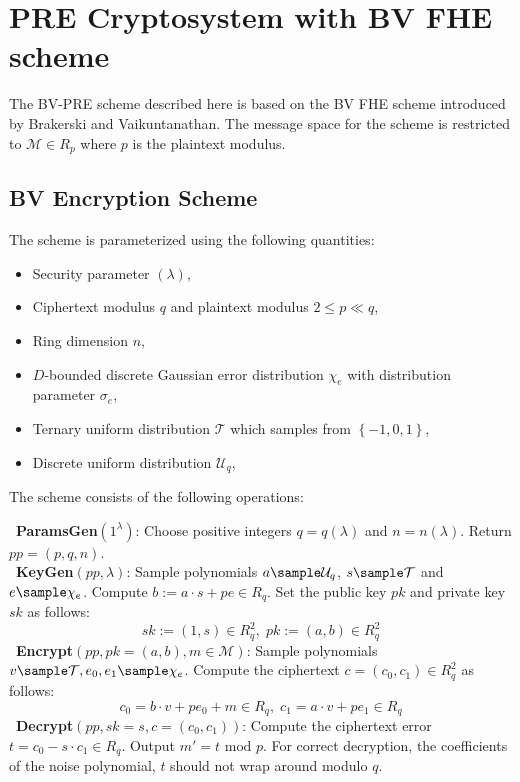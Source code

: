 \section{PRE Cryptosystem with BV FHE scheme} \label{bvpre}

The BV-PRE \cite{polyakov2017fast} scheme described here is based on the BV FHE \cite{brakerski2011fully} scheme introduced by Brakerski and Vaikuntanathan. The message space for the scheme is restricted to $\mathcal{M} \in R_p$ where $p$ is the plaintext modulus.

\subsection{BV Encryption Scheme}

The scheme is parameterized using the following quantities:

\begin{itemize}
\item Security parameter $\left( \lambda \right)$,
\item Ciphertext modulus $q$ and plaintext modulus $2 \leq p \ll q$,
\item Ring dimension $n$,
\item $D$-bounded discrete Gaussian error distribution $\chi_e$ with distribution parameter $\sigma_e$,
\item Ternary uniform distribution $\mathcal{T}$ which samples from  $\left\{ -1, 0, 1 \right\}$, 
\item Discrete uniform distribution $\mathcal{U}_q$,
\end{itemize}


The scheme consists of the following operations:

\noindent \textbullet\ \textbf{ParamsGen$\left(1^\lambda\right)$}: Choose positive integers $q = q\left(\lambda\right)$ and $n = n\left( \lambda \right)$. Return $pp = \left(p,q,n\right)$.\\
\noindent \textbullet\ \textbf{KeyGen$\left(pp, \lambda \right)$}: Sample polynomials $a \sample \mathcal{U}_q$, $s \sample \mathcal{T}$ and $e \sample \chi_e$. Compute $b := a\cdot s + pe \in R_q$. Set the public key $pk$ and private key $sk$ as follows: $$sk := \left( 1,s \right) \in R_q^2, \; pk := \left(a,b\right) \in R_q^2$$
\noindent \textbullet\ \textbf{Encrypt$\left(pp, pk = \left(a,b\right), m \in \mathcal{M} \right)$}: Sample polynomials $v \sample \mathcal{T}, e_0, e_1 \sample \chi_e$. Compute the ciphertext $c = \left( c_0,c_1 \right) \in R_q^2$ as follows: $$c_0 = b\cdot v + pe_0 +m \in R_q, \; c_1 = a\cdot v + pe_1 \in R_q$$
\noindent \textbullet\ \textbf{Decrypt}$\left(pp, sk = s, c = \left(c_0,c_1\right) \right)$:  Compute the ciphertext error $ t = c_0 - s \cdot c_1 \in R_q$. Output $m' = t  \text{ mod } p$. For correct decryption, the coefficients of the noise polynomial, $t$ should not wrap around modulo $q$.

